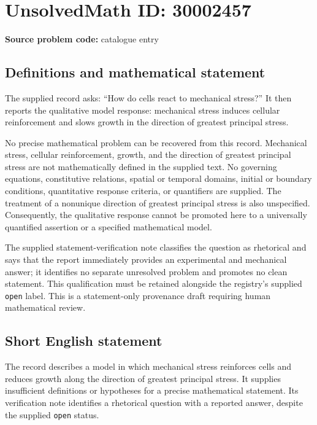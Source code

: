 \documentclass[11pt]{article}
\begin{document}
\section*{UnsolvedMath ID: 30002457}
\textbf{Source problem code:} catalogue entry
\subsection{Definitions and mathematical statement}
The supplied record asks: ``How do cells react to mechanical stress?'' It then reports the qualitative model response: mechanical stress induces cellular reinforcement and slows growth in the direction of greatest principal stress.

No precise mathematical problem can be recovered from this record. Mechanical stress, cellular reinforcement, growth, and the direction of greatest principal stress are not mathematically defined in the supplied text. No governing equations, constitutive relations, spatial or temporal domains, initial or boundary conditions, quantitative response criteria, or quantifiers are supplied. The treatment of a nonunique direction of greatest principal stress is also unspecified. Consequently, the qualitative response cannot be promoted here to a universally quantified assertion or a specified mathematical model.

The supplied statement-verification note classifies the question as rhetorical and says that the report immediately provides an experimental and mechanical answer; it identifies no separate unresolved problem and promotes no clean statement. This qualification must be retained alongside the registry's supplied \texttt{open} label. This is a statement-only provenance draft requiring human mathematical review.
\subsection{Short English statement}
The record describes a model in which mechanical stress reinforces cells and reduces growth along the direction of greatest principal stress. It supplies insufficient definitions or hypotheses for a precise mathematical statement. Its verification note identifies a rhetorical question with a reported answer, despite the supplied \texttt{open} status.
\end{document}
